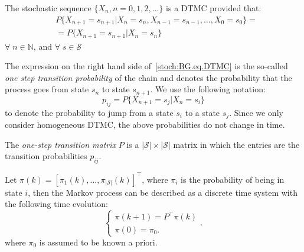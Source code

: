 \begin{definition}
The stochastic sequence $\{X_n, n = 0,1,2,\ldots\}$ is a DTMC provided that:
\begin{equation}
\begin{split}
&P\{X_{n+1} = s_{n+1} \vert X_{n} = s_{n}, X_{n-1} = s_{n-1}, \ldots, X_0 = s_0\} =\\
&=P\{X_{n+1} = s_{n+1} \vert X_{n} = s_{n}\}
\end{split}
\label{stoch:BG.eq.DTMC}
\end{equation}
$\forall \; n\in \mathbb{N}$, and $\forall \; s\in \mathcal{S}$
\end{definition}
The expression on the right hand side of~\eqref{stoch:BG.eq.DTMC} is the so-called \emph{one step transition probability} of the chain and denotes the probability that the process goes from state $s_{n}$ to state $s_{n+1}$. We use the following notation:
\begin{equation}
p_{ij} = P\{X_{n+1} = s_j \vert X_{n} = s_i\}
\end{equation}
to denote the probability to jump from a state $s_i$ to a state $s_j$. Since we only consider homogeneous DTMC, the above probabilities do not change in time.
\begin{definition}
\label{stoch:bg.def.p}
The \emph{one-step transition matrix} $P$ is a $\left\vert{\mathcal{S}}\right\vert \times \left\vert{\mathcal{S}}\right\vert$ matrix in which the entries are the transition probabilities $p_{ij}$.
\end{definition} 
Let $\pi(k)=[\pi_1(k),\ldots, \pi_{\left\vert{\mathcal{S}}\right\vert}(k)]^\top$, where $\pi_i$ is the probability of being in state $i$, then the Markov process can be described as a discrete time system with the following time evolution:
\begin{equation}
\label{stoch:bg.eq.discrete}
\begin{cases}
\pi(k+1)=P^\top\pi(k) \\
\pi(0)= \pi_0.
\end{cases}.
\end{equation}
where $\pi_0$ is assumed to be known a priori.


